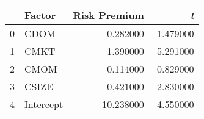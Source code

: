 \begin{tabular}{llrr}
\toprule
 & Factor & Risk Premium & \emph{t} \\
\midrule
0 & CDOM & -0.282000 & -1.479000 \\
1 & CMKT & 1.390000 & 5.291000 \\
2 & CMOM & 0.114000 & 0.829000 \\
3 & CSIZE & 0.421000 & 2.830000 \\
4 & Intercept & 10.238000 & 4.550000 \\
\bottomrule
\end{tabular}
